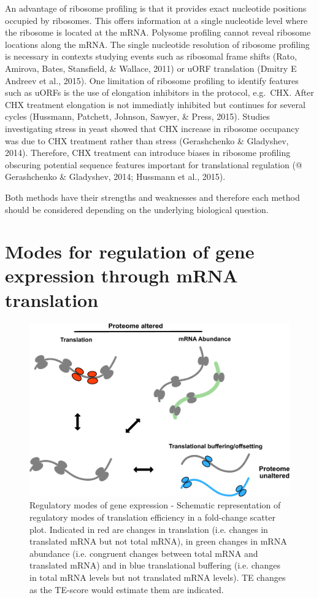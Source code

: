 \documentclass[12pt,openany]{book}
\begin{document}
An advantage of ribosome profiling is that it provides exact nucleotide
positions occupied by ribosomes. This offers information at a single
nucleotide level where the ribosome is located at the mRNA. Polysome
profiling cannot reveal ribosome locations along the mRNA. The single
nucleotide resolution of ribosome profiling is necessary in contexts
studying events such as ribosomal frame shifts (Rato, Amirova, Bates,
Stansfield, \& Wallace, 2011) or uORF translation (Dmitry E Andreev et
al., 2015). One limitation of ribosome profiling to identify features
such as uORFs is the use of elongation inhibitors in the protocol,
e.g.~CHX. After CHX treatment elongation is not immediatly inhibited but
continues for several cycles (Hussmann, Patchett, Johnson, Sawyer, \&
Press, 2015). Studies investigating stress in yeast showed that CHX
increase in ribosome occupancy was due to CHX treatment rather than
stress (Gerashchenko \& Gladyshev, 2014). Therefore, CHX treatment can
introduce biases in ribosome profiling obscuring potential sequence
features important for translational regulation (@ Gerashchenko \&
Gladyshev, 2014; Hussmann et al., 2015).

Both methods have their strengths and weaknesses and therefore each
method should be considered depending on the underlying biological
question. \newline
\section{Modes for regulation of gene expression through mRNA translation} \label{modes}

\begin{figure}
  \includegraphics{./figures/geneModes_MRNA.pdf}
  \caption{Regulatory modes of gene expression - Schematic representation of regulatory modes of translation efficiency in a fold-change scatter plot. Indicated in red are changes in translation (i.e. changes in translated mRNA but not total mRNA), in green changes in mRNA abundance (i.e. congruent changes between total mRNA and translated mRNA) and in blue translational buffering (i.e. changes in total mRNA levels but not translated mRNA levels). TE changes as the TE-score would estimate them are indicated.\label{fig:modes}}
\end{figure}
\end{document}
